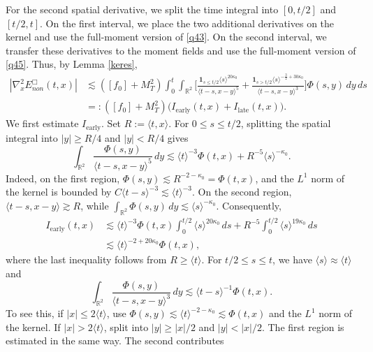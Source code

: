 \documentclass[reqno,11pt]{amsart}
\numberwithin{equation}{section}
\begin{document}
For the second spatial derivative, we split the time integral into
$[0,t/2]$ and $[t/2,t]$. On the first interval, we place the two
additional derivatives on the kernel and use the full-moment version
of \eqref{q43}. On the second interval, we transfer these derivatives
to the moment fields and use the full-moment version of \eqref{q45}.
Thus, by Lemma \ref{keres},
\begin{align*}
|\nabla_x^2E^\Box_{non}(t,x)|
&\lesssim ([f_0]+M_T^2)
\int_0^t\!\!\int_{\mathbb R^2}
\Bigg[
\frac{\mathbf{1}_{s\leq t/2}\langle s\rangle^{20\kappa_0}}
{\langle t-s,x-y\rangle^5}+
\frac{\mathbf{1}_{s>t/2}
\langle s\rangle^{-\frac32+30\kappa_0}}
{\langle t-s,x-y\rangle^3}
\Bigg]\Phi(s,y)\,dy\,ds\\
&=:([f_0]+M_T^2)
\bigl(I_{\mathrm{early}}(t,x)+I_{\mathrm{late}}(t,x)\bigr).
\end{align*}
We first estimate $I_{\mathrm{early}}$. Set
$R:=\langle t,x\rangle$. For $0\leq s\leq t/2$, splitting the
spatial integral into $|y|\geq R/4$ and $|y|<R/4$ gives
\begin{equation*}
\int_{\mathbb R^2}
\frac{\Phi(s,y)}{\langle t-s,x-y\rangle^5}\,dy
\lesssim
\langle t\rangle^{-3}\Phi(t,x)
+R^{-5}\langle s\rangle^{-\kappa_0}.
\end{equation*}
Indeed, on the first region,
$\Phi(s,y)\lesssim R^{-2-\kappa_0}=\Phi(t,x)$, and
the $L^1$ norm of the kernel is bounded by
$C\langle t-s\rangle^{-3}\lesssim\langle t\rangle^{-3}$.
On the second region, $\langle t-s,x-y\rangle\gtrsim R$,
while
$\int_{\mathbb R^2}\Phi(s,y)\,dy
\lesssim\langle s\rangle^{-\kappa_0}$.
Consequently,
\begin{align*}
I_{\mathrm{early}}(t,x)
&\lesssim
\langle t\rangle^{-3}\Phi(t,x)
\int_0^{t/2}\langle s\rangle^{20\kappa_0}\,ds
+R^{-5}\int_0^{t/2}\langle s\rangle^{19\kappa_0}\,ds\\
&\lesssim
\langle t\rangle^{-2+20\kappa_0}\Phi(t,x),
\end{align*}
where the last inequality follows from $R\geq\langle t\rangle$.
For $t/2\leq s\leq t$, we have
$\langle s\rangle\approx\langle t\rangle$ and
\begin{equation*}
\int_{\mathbb R^2}
\frac{\Phi(s,y)}{\langle t-s,x-y\rangle^3}\,dy
\lesssim
\langle t-s\rangle^{-1}\Phi(t,x).
\end{equation*}
To see this, if $|x|\leq2\langle t\rangle$, use
$\Phi(s,y)\lesssim\langle t\rangle^{-2-\kappa_0}
\lesssim\Phi(t,x)$ and the $L^1$ norm of the kernel.
If $|x|>2\langle t\rangle$, split into
$|y|\geq|x|/2$ and $|y|<|x|/2$.
The first region is estimated in the same way. The second contributes
\end{document}
